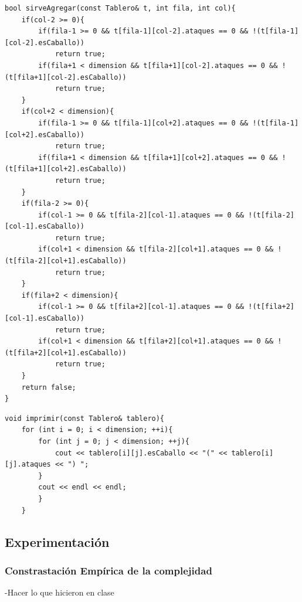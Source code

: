 \newpage

	\begin{codesnippet}
	\begin{verbatim}
bool sirveAgregar(const Tablero& t, int fila, int col){
    if(col-2 >= 0){
        if(fila-1 >= 0 && t[fila-1][col-2].ataques == 0 && !(t[fila-1][col-2].esCaballo))
            return true;
        if(fila+1 < dimension && t[fila+1][col-2].ataques == 0 && !(t[fila+1][col-2].esCaballo))
            return true;
    }
    if(col+2 < dimension){
        if(fila-1 >= 0 && t[fila-1][col+2].ataques == 0 && !(t[fila-1][col+2].esCaballo))
            return true;
        if(fila+1 < dimension && t[fila+1][col+2].ataques == 0 && !(t[fila+1][col+2].esCaballo)) 
            return true;
    }
    if(fila-2 >= 0){
        if(col-1 >= 0 && t[fila-2][col-1].ataques == 0 && !(t[fila-2][col-1].esCaballo)) 
            return true;
        if(col+1 < dimension && t[fila-2][col+1].ataques == 0 && !(t[fila-2][col+1].esCaballo))
            return true;
    }
    if(fila+2 < dimension){
        if(col-1 >= 0 && t[fila+2][col-1].ataques == 0 && !(t[fila+2][col-1].esCaballo)) 
            return true;
        if(col+1 < dimension && t[fila+2][col+1].ataques == 0 && !(t[fila+2][col+1].esCaballo)) 
            return true;
    }
    return false;
}
	\end{verbatim}
	\end{codesnippet}
	
		\begin{codesnippet}
	\begin{verbatim}
void imprimir(const Tablero& tablero){
    for (int i = 0; i < dimension; ++i){
        for (int j = 0; j < dimension; ++j){
            cout << tablero[i][j].esCaballo << "(" << tablero[i][j].ataques << ") ";
        }
        cout << endl << endl;    
        }
    }
	\end{verbatim}
	\end{codesnippet}

\newpage
\subsection{Experimentaci\'on}

\subsubsection{Constrastaci\'on Emp\'irica de la complejidad}\label{tiempos}
-Hacer lo que hicieron en clase\\
\newpage
